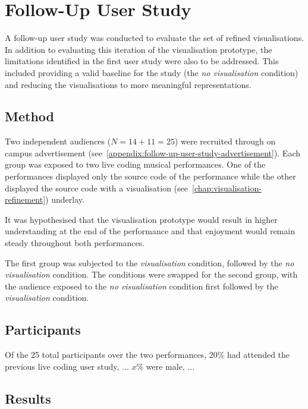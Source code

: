 
\chapter{Follow-Up User Study}
\label{chap:follow-up-user-study}

A follow-up user study was conducted to evaluate the set of refined visualisations. In addition to evaluating this iteration of the visualisation prototype, the limitations identified in the first user study were also to be addressed. This included providing a valid baseline for the study (the \emph{no visualisation} condition) and reducing the visualisations to more meaningful representations.

\section{Method}

Two independent audiences ($N=14+11=25$) were recruited through on campus advertisement (see~\ref{appendix:follow-up-user-study-advertisement}). Each group was exposed to two live coding musical performances. One of the performances displayed only the source code of the performance while the other displayed the source code with a visualisation (see~\ref{chap:visualisation-refinement}) underlay.

It was hypothesised that the visualisation prototype would result in higher understanding at the end of the performance and that enjoyment would remain steady throughout both performances.

The first group was subjected to the \emph{visualisation} condition, followed by the \emph{no visualisation} condition. The conditions were swapped for the second group, with the audience exposed to the \emph{no visualisation} condition first followed by the \emph{visualisation} condition.

\section{Participants}

Of the 25 total participants over the two performances, $20\%$ had attended the previous live coding user study, {\color{red} ... $x\%$ were male, ...}


\section{Results}

